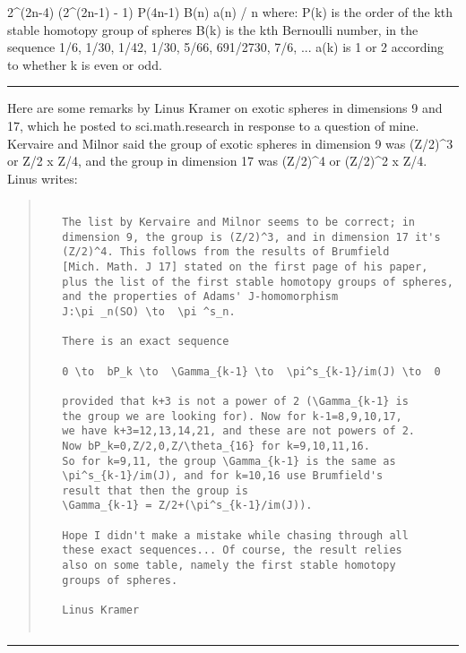 2^(2n-4) (2^(2n-1) - 1) P(4n-1) B(n) a(n) / n
where:
P(k)    is the order of the kth stable homotopy group of spheres
B(k)      is the kth Bernoulli number, in the sequence
           1/6, 1/30, 1/42, 1/30, 5/66, 691/2730, 7/6, ...
a(k)      is 1 or 2 according to whether k is even or odd.
\par\noindent\rule{\textwidth}{0.4pt}
Here are some remarks by Linus Kramer on exotic spheres in 
dimensions 9 and 17, which he posted to sci.math.research in
response to a question of mine.  Kervaire and Milnor said the group
of exotic spheres in dimension 9 was (Z/2)^{3} or Z/2 x Z/4,
and the group in dimension 17 was (Z/2)^{4} or (Z/2)^{2} 
x Z/4. Linus writes:

\begin{quote}

\begin{verbatim}

   The list by Kervaire and Milnor seems to be correct; in
   dimension 9, the group is (Z/2)^3, and in dimension 17 it's
   (Z/2)^4. This follows from the results of Brumfield
   [Mich. Math. J 17] stated on the first page of his paper,
   plus the list of the first stable homotopy groups of spheres,
   and the properties of Adams' J-homomorphism
   J:\pi _n(SO) \to  \pi ^s_n.
    
   There is an exact sequence
    
   0 \to  bP_k \to  \Gamma_{k-1} \to  \pi^s_{k-1}/im(J) \to  0 
    
   provided that k+3 is not a power of 2 (\Gamma_{k-1} is
   the group we are looking for). Now for k-1=8,9,10,17,
   we have k+3=12,13,14,21, and these are not powers of 2.
   Now bP_k=0,Z/2,0,Z/\theta_{16} for k=9,10,11,16.
   So for k=9,11, the group \Gamma_{k-1} is the same as
   \pi^s_{k-1}/im(J), and for k=10,16 use Brumfield's
   result that then the group is
   \Gamma_{k-1} = Z/2+(\pi^s_{k-1}/im(J)).
    
   Hope I didn't make a mistake while chasing through all
   these exact sequences... Of course, the result relies
   also on some table, namely the first stable homotopy
   groups of spheres.
    
   Linus Kramer
    
\end{verbatim}
    
\end{quote}
 








 \par\noindent\rule{\textwidth}{0.4pt}

